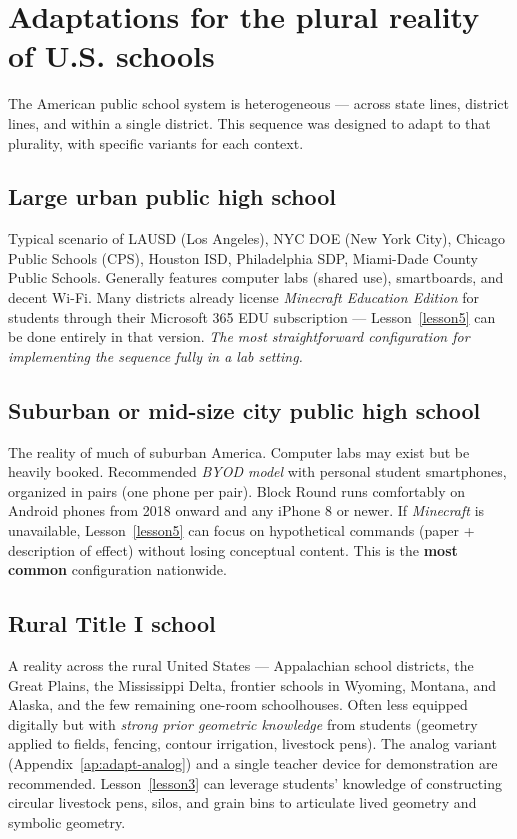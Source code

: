 \documentclass[12pt,a4paper]{scrartcl}
\newcommand{\acc}[1]{\textcolor{accent}{\textbf{#1}}}
\begin{document}
\section{Adaptations for the plural reality of U.S. schools}\label{sec:adapt}

The American public school system is heterogeneous --- across state lines, district lines, and within a single district. This sequence was designed to adapt to that plurality, with specific variants for each context.

\subsection{Large urban public high school}
Typical scenario of LAUSD (Los Angeles), NYC DOE (New York City), Chicago Public Schools (CPS), Houston ISD, Philadelphia SDP, Miami-Dade County Public Schools. Generally features computer labs (shared use), smartboards, and decent Wi-Fi. Many districts already license \emph{Minecraft Education Edition} for students through their Microsoft 365 EDU subscription --- Lesson~\ref{lesson5} can be done entirely in that version. \emph{The most straightforward configuration for implementing the sequence fully in a lab setting.}

\subsection{Suburban or mid-size city public high school}
The reality of much of suburban America. Computer labs may exist but be heavily booked. Recommended \emph{BYOD model} with personal student smartphones, organized in pairs (one phone per pair). Block Round runs comfortably on Android phones from 2018 onward and any iPhone 8 or newer. If \emph{Minecraft} is unavailable, Lesson~\ref{lesson5} can focus on hypothetical commands (paper + description of effect) without losing conceptual content. This is the \acc{most common} configuration nationwide.

\subsection{Rural Title I school}
A reality across the rural United States --- Appalachian school districts, the Great Plains, the Mississippi Delta, frontier schools in Wyoming, Montana, and Alaska, and the few remaining one-room schoolhouses. Often less equipped digitally but with \emph{strong prior geometric knowledge} from students (geometry applied to fields, fencing, contour irrigation, livestock pens). The analog variant (Appendix~\ref{ap:adapt-analog}) and a single teacher device for demonstration are recommended. Lesson~\ref{lesson3} can leverage students' knowledge of constructing circular livestock pens, silos, and grain bins to articulate lived geometry and symbolic geometry.
\end{document}
